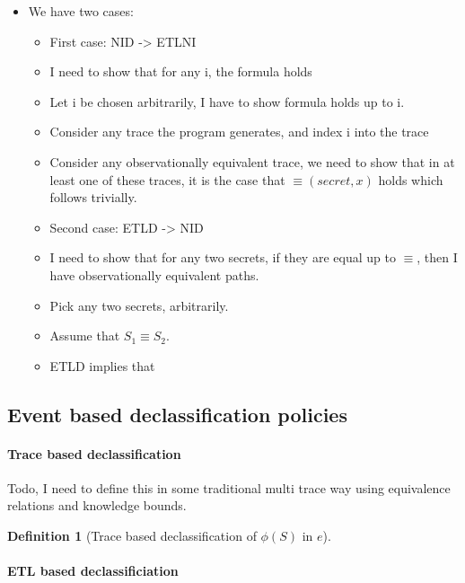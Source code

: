 \documentclass{sig-alternate}
\theoremstyle{definition}
\newtheorem{defn}{Definition}[section]
\begin{document}
{\begin{itemize}
\item We have two cases:
  \begin{itemize}
  \item First case: NID -> ETLNI
  \item I need to show that for any i, the formula holds
  \item Let i be chosen arbitrarily, I have to show formula holds up
    to i.
  \item Consider any trace the program generates, and index i into the
    trace
  \item Consider any observationally equivalent trace, we need to show
    that in at least one of these traces, it is the case that
    $\equiv(secret,x)$ holds which follows trivially.
  \end{itemize}
  \begin{itemize}
  \item Second case: ETLD -> NID
  \item I need to show that for any two secrets, if they are equal up
    to $\equiv$, then I have observationally equivalent paths.
  \item Pick any two secrets, arbitrarily.
  \item Assume that $S_1 \equiv S_2$.
  \item ETLD implies that 
  \end{itemize}
\end{itemize}

\subsection{Event based declassification policies}

\paragraph*{Trace based declassification}

Todo, I need to define this in some traditional multi trace way using
equivalence relations and knowledge bounds.

\begin{defn}[Trace based declassification of $\phi(S)$ in $e$]
\end{defn}

\paragraph*{ETL based declassificiation}

}
\end{document}
